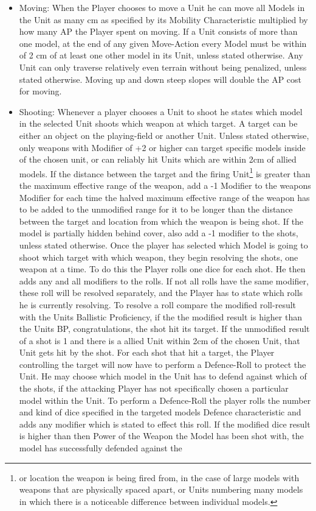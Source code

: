 \documentclass[a4paper,12pt]{report}
\begin{document}
\begin{adjustwidth}{-2cm}{-2cm}
\begin{multicols}{2}
\begin{itemize}

	\item Moving: When the Player chooses to move a Unit he can move all Models in the Unit as many cm as specified by its Mobility Characteristic multiplied by how many AP the Player spent on moving. If a Unit consists of more than one model, at the end of any given Move-Action every Model must be within of 2 cm of at least one other model in its Unit, unless stated otherwise. Any Unit can only traverse relatively even terrain without being penalized, unless stated otherwise. Moving up and down steep slopes will double the AP cost for moving.
	\item Shooting: Whenever a player chooses a Unit to shoot he states which model in the selected Unit shoots which weapon at which target. A target can be either an object on the playing-field or another Unit. Unless stated otherwise, only weapons with Modifier of +2 or higher can target specific models inside of the chosen unit, or can reliably hit Units which are within 2cm of allied models. If the distance between the target and the firing Unit\footnote{or location the weapon is being fired from, in the case of large models with weapons that are physically spaced apart, or Units numbering many models in which there is a noticeable difference between individual models.} is greater than the maximum effective range of the weapon, add a -1 Modifier to the weapons Modifier for each time the halved maximum effective range of the weapon has to be added to the unmodified range for it to be longer than the distance between the target and location from which the weapon is being shot. If the model is partially hidden behind cover, also add a -1 modifier to the shots, unless stated otherwise. Once the player has selected which Model is going to shoot which target with which weapon, they begin resolving the shots, one weapon at a time. To do this the Player rolls one dice for each shot. He then adds any and all modifiers to the rolls. If not all rolls have the same modifier, these roll will be resolved separately, and the Player has to state which rolls he is currently resolving. To resolve a roll compare the modified roll-result with the Units Ballistic Proficiency, if the the modified result is higher than the Units BP, congratulations, the shot hit its target. If the unmodified result of a shot is 1 and there is a allied Unit within 2cm of the chosen Unit, that Unit gets hit by the shot. For each shot that hit a target, the Player controlling the target will now have to perform a Defence-Roll to protect the Unit. He may choose which model in the Unit has to defend against which of the shots, if the attacking Player has not specifically chosen a particular model within the Unit. To perform a Defence-Roll the player rolls the number and kind of dice specified in the targeted models Defence characteristic and adds any modifier which is stated to effect this roll. If the modified dice result is higher than then Power of the Weapon the Model has been shot with, the model has successfully defended against the  
\end{itemize}
\end{multicols}
\end{adjustwidth}
\end{document}
